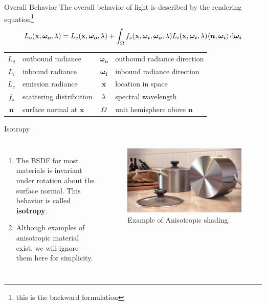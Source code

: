 \documentclass[10pt]{beamer}
\DeclarePairedDelimiter\ip{\langle }{\rangle}
\begin{document}
\begin{frame}{Overall Behavior}
  The overall behavior of light is described by the rendering equation\footnote{this is the backward formulation}
  \[L_{o}(\mathbf x, \bm {\omega_{o}}, \lambda) = L_{e}(\mathbf x, \bm{\omega_o}, \lambda) + \int_\Omega f_s(\mathbf x, \bm{\omega_i}, \bm{\omega_o}, \lambda)L_i(\mathbf x, \bm{\omega_i}, \lambda)\ip{\bm n, \bm{\omega_i}} \dif \bm{\omega_i}\]

  \hrulefill

  \begin{center}
    \begin{tabu}{clcl}
      \(L_{o}\)& outbound radiance & \(\bm{\omega_o}\)& outbound radiance direction\\
      \(L_{i}\)& inbound radiance & \(\bm{\omega_i}\) &inbound radiance direction\\
      \(L_{e}\)& emission radiance & \(\mathbf x\) &location in space\\
      \(f_s\) & scattering distribution & \(\lambda\)& spectral wavelength\\
      \(\bm n\)& surface normal at \(\mathbf x\) & \(\Omega\) & unit hemisphere above \(\bm n\)
    \end{tabu}
  \end{center}
\end{frame}

\begin{frame}{Isotropy}
  \begin{columns}
    \begin{enumerate}
    \item The BSDF for most materials is invariant under rotation about the surface normal.
      This behavior is called \textbf{isotropy}.

    \item Although examples of anisotropic material exist, we will ignore them here for simplicity.
    \end{enumerate}

    \begin{figure}[H]
      \centering
      \includegraphics[scale=0.07]{anisotropy.jpg}
      \caption{Example of Anisotropic shading.}
    \end{figure}
  \end{columns}
\end{frame}
\end{document}
